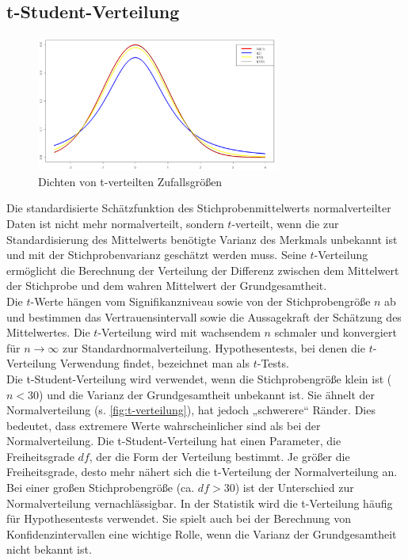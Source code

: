 \subsection{t-Student-Verteilung}
\label{sec:t_student_distribution}
\begin{figure}[h]
    \centering
    \includegraphics[width=8cm]{Bilder/t-Studentenverteilung.png}
    \caption{
        Dichten von t-verteilten Zufallsgrößen \cite{studenten_t_verteilung}}    
    \label{fig:t-verteilung}
\end{figure}
Die standardisierte Schätzfunktion des Stichprobenmittelwerts normalverteilter Daten ist nicht mehr normalverteilt, sondern \(t\)-verteilt, wenn die zur Standardisierung des Mittelwerts benötigte Varianz des Merkmals unbekannt ist und mit der Stichprobenvarianz geschätzt werden muss. Seine \(t\)-Verteilung ermöglicht die Berechnung der Verteilung der Differenz zwischen dem Mittelwert der Stichprobe und dem wahren Mittelwert der Grundgesamtheit. \\
Die \(t\)-Werte hängen vom Signifikanzniveau sowie von der Stichprobengröße \(n\) ab und bestimmen das Vertrauensintervall sowie die Aussagekraft der Schätzung des Mittelwertes. Die \(t\)-Verteilung wird mit wachsendem \(n\) schmaler und konvergiert für \(n \to \infty\) zur Standardnormalverteilung. Hypothesentests, bei denen die \(t\)-Verteilung Verwendung findet, bezeichnet man als \(t\)-Tests. \cite{studenten_t_verteilung}\\
Die t-Student-Verteilung wird verwendet, wenn die Stichprobengröße klein ist (\(n < 30\)) und die Varianz der Grundgesamtheit unbekannt ist. Sie ähnelt der Normalverteilung (s. \autoref{fig:t-verteilung}), hat jedoch „schwerere“ Ränder. Dies bedeutet, dass extremere Werte wahrscheinlicher sind als bei der Normalverteilung.
Die t-Student-Verteilung hat einen Parameter, die Freiheitsgrade \(df\), der die Form der Verteilung bestimmt. Je größer die Freiheitsgrade, desto mehr nähert sich die t-Verteilung der Normalverteilung an. Bei einer großen Stichprobengröße (ca. \(df > 30\)) ist der Unterschied zur Normalverteilung vernachlässigbar.
In der Statistik wird die t-Verteilung häufig für Hypothesentests verwendet. Sie spielt auch bei der Berechnung von Konfidenzintervallen eine wichtige Rolle, wenn die Varianz der Grundgesamtheit nicht bekannt ist.


